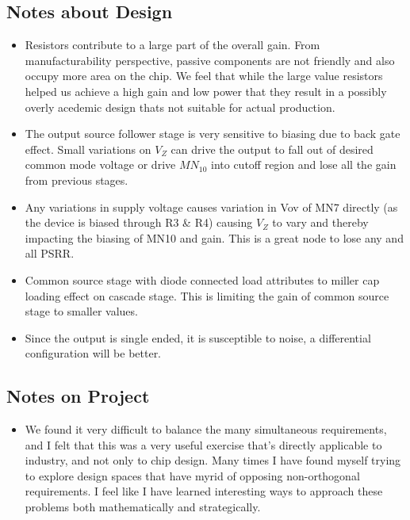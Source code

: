 \documentclass[12pt,a4paper]{article}
\begin{document}
\subsection{Notes about Design}
\begin{itemize}
\item Resistors contribute to a large part of the overall gain. From manufacturability perspective, passive components are not friendly and 
also occupy more area on the chip. We feel that while the large value resistors helped us achieve a high gain and low power that they result in a
possibly overly acedemic design thats not suitable for actual production.
\item The output source follower stage is very sensitive to biasing due to back gate effect. Small variations on $V_Z$ can drive the output to fall 
out of desired common mode voltage or drive $MN_10$ into cutoff region and lose all the gain from previous stages.
\item Any variations in supply voltage causes variation in Vov of MN7 directly (as the device is biased through R3 \& R4) causing $V_Z$ to vary 
and thereby impacting the biasing of MN10 and gain. This is a great node to lose any and all PSRR.
\item Common source stage with diode connected load attributes to miller cap loading effect on cascade stage. This is limiting the gain of common 
source stage to smaller values.
\item Since the output is single ended, it is susceptible to noise, a differential configuration will be better.
 
\end{itemize}

\subsection{Notes on Project}
\begin{itemize}
\item We found it very difficult to balance the many simultaneous requirements, and I felt that this was a very useful exercise that's directly applicable to industry, and not only to chip design. Many times I have found myself trying to explore design spaces that have myrid of opposing non-orthogonal requirements. I feel like I have learned interesting ways to approach these problems both mathematically and strategically.
\end{itemize}
\pagebreak

\end{document}
